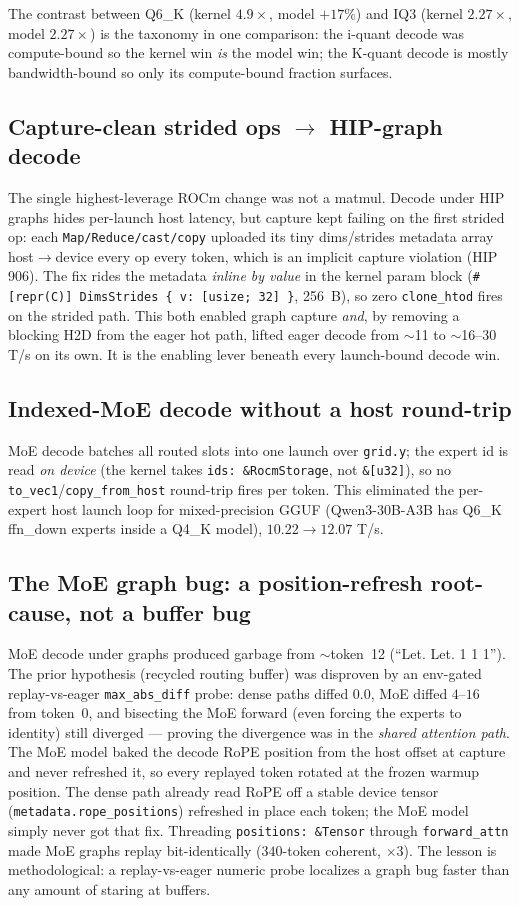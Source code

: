 \documentclass[11pt]{article}
\newcommand{\x}{\ensuremath{\times}}
\begin{document}
\noindent The contrast between Q6\_K (kernel $4.9\x$, model $+17\%$) and IQ3 (kernel $2.27\x$, model
$2.27\x$) is the taxonomy in one comparison: the i-quant decode was compute-bound so the kernel win
\emph{is} the model win; the K-quant decode is mostly bandwidth-bound so only its compute-bound
fraction surfaces.

\subsection{Capture-clean strided ops $\to$ HIP-graph decode}
The single highest-leverage ROCm change was not a matmul. Decode under HIP graphs hides per-launch
host latency, but capture kept failing on the first strided op: each \texttt{Map/Reduce/cast/copy}
uploaded its tiny dims/strides metadata array host$\to$device every op every token, which is an
implicit capture violation (HIP 906). The fix rides the metadata \emph{inline by value} in the
kernel param block (\texttt{\#[repr(C)] DimsStrides \{ v: [usize; 32] \}}, 256~B), so zero
\texttt{clone\_htod} fires on the strided path. This both enabled graph capture \emph{and}, by
removing a blocking H2D from the eager hot path, lifted eager decode from $\sim$11 to $\sim$16--30
T/s on its own. It is the enabling lever beneath every launch-bound decode win.

\subsection{Indexed-MoE decode without a host round-trip}
MoE decode batches all routed slots into one launch over \texttt{grid.y}; the expert id is read
\emph{on device} (the kernel takes \texttt{ids: \&RocmStorage}, not \texttt{\&[u32]}), so no
\texttt{to\_vec1}/\texttt{copy\_from\_host} round-trip fires per token. This eliminated the
per-expert host launch loop for mixed-precision GGUF (Qwen3-30B-A3B has Q6\_K ffn\_down experts
inside a Q4\_K model), $10.22\to12.07$ T/s.

\subsection{The MoE graph bug: a position-refresh root-cause, not a buffer bug}
MoE decode under graphs produced garbage from $\sim$token~12 (``Let. Let. 1 1 1''). The
prior hypothesis (recycled routing buffer) was disproven by an env-gated replay-vs-eager
\texttt{max\_abs\_diff} probe: dense paths diffed $0.0$, MoE diffed $4$--$16$ from token~0, and
bisecting the MoE forward (even forcing the experts to identity) still diverged --- proving the
divergence was in the \emph{shared attention path}. The MoE model baked the decode RoPE position
from the host offset at capture and never refreshed it, so every replayed token rotated at the
frozen warmup position. The dense path already read RoPE off a stable device tensor
(\texttt{metadata.rope\_positions}) refreshed in place each token; the MoE model simply never got
that fix. Threading \texttt{positions: \&Tensor} through \texttt{forward\_attn} made MoE graphs
replay bit-identically ($340$-token coherent, $\times 3$). The lesson is methodological: a
replay-vs-eager numeric probe localizes a graph bug faster than any amount of staring at buffers.
\end{document}
